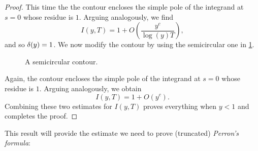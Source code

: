 \documentclass[12pt]{article}
\begin{document}
\begin{proof}
      This time the the contour encloses the simple pole of the integrand at \(s = 0\) whose residue is \(1\). Arguing analogously, we find
      \[
        I(y,T) = 1+O\left(\frac{y^{c}}{\log(y)T}\right),
      \]
      and so \(\delta(y) = 1\). We now modify the contour by using the semicircular one in \cref{fig:discontinuous_integral_contour_4}. 
      
      \begin{figure}[h]
        \centering
        \caption{A semicircular contour.}
        \label{fig:discontinuous_integral_contour_4}
      \end{figure}

      Again, the contour encloses the simple pole of the integrand at \(s = 0\) whose residue is \(1\). Arguing analogously, we obtain
      \[
        I(y,T) = 1+O(y^{c}).
      \]
      Combining these two estimates for \(I(y,T)\) proves everything when \(y < 1\) and completes the proof.
    \end{proof}

    This result will provide the estimate we need to prove (truncated) \textit{Perron's formula}:
\end{document}
